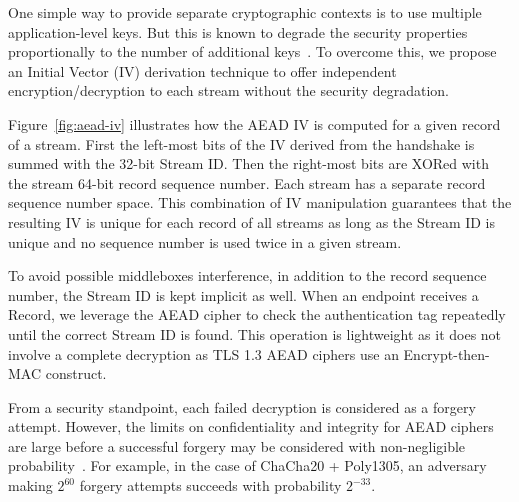 One simple way to provide separate cryptographic contexts is to use multiple application-level
keys. But this is known to degrade the security properties proportionally to the number of
additional keys~\cite{chatterjee2011another}. To overcome this, we propose an
Initial Vector (IV) derivation technique to offer independent
encryption/decryption to each stream without the security degradation.

Figure~\ref{fig:aead-iv} illustrates how the AEAD IV is computed for a 
given \tcpls record of a \tcpls stream. First the left-most bits of the IV derived from the \tls handshake
is summed with the 32-bit \tcpls Stream ID. Then the right-most bits are XORed with the
stream 64-bit record sequence number. Each \tcpls stream has a separate record
sequence number space. This combination of IV manipulation guarantees that the
resulting IV is unique for each record of all \tcpls streams as long as the
Stream ID is unique and no sequence number is used twice in a given stream.

To avoid possible middleboxes interference, in addition to the record sequence number, 
the \tcpls Stream ID is kept implicit as well. When an endpoint receives a 
\tcpls Record, 
we leverage the AEAD cipher to check the authentication tag repeatedly until the
correct \tcpls Stream ID is found. This operation is lightweight as it does not
involve a complete decryption as TLS 1.3 AEAD ciphers use an Encrypt-then-MAC construct.

From a security standpoint, each failed decryption is considered as a
forgery attempt. However, the limits on confidentiality and
integrity for AEAD ciphers are large before a
successful forgery may be considered with non-negligible probability~\cite{luykx2015limits, aeadlimits}. For
example, in the case of ChaCha20 + Poly1305, an adversary making $2^{60}$ forgery
attempts succeeds with probability $2^{-33}$.


%

